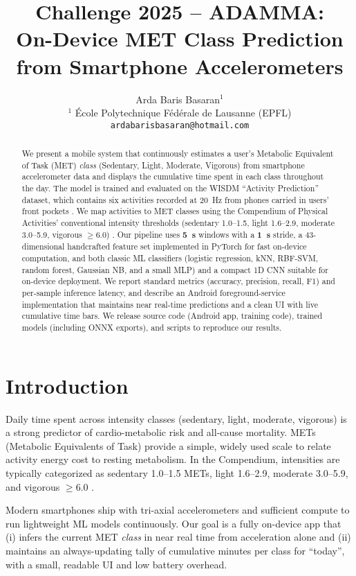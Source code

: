 \documentclass[10pt,twocolumn]{article}
\title{Challenge 2025 -- ADAMMA:\\
On-Device MET Class Prediction from Smartphone Accelerometers}
\author{Arda Baris Basaran$^{1}$ \\
\small $^{1}$ École Polytechnique Fédérale de Lausanne (EPFL) \\
\small \texttt{ardabarisbasaran@hotmail.com}
}
\date{}
\begin{document}
\maketitle

\begin{abstract}
\noindent
We present a mobile system that continuously estimates a user's Metabolic Equivalent of Task (MET) \emph{class} (Sedentary, Light, Moderate, Vigorous) from smartphone accelerometer data and displays the cumulative time spent in each class throughout the day. The model is trained and evaluated on the WISDM ``Activity Prediction'' dataset, which contains six activities recorded at \SI{20}{Hz} from phones carried in users' front pockets \cite{Kwapisz2010,wisdm_site}. We map activities to MET classes using the Compendium of Physical Activities' conventional intensity thresholds (sedentary 1.0--1.5, light 1.6--2.9, moderate 3.0--5.9, vigorous $\geq$6.0) \cite{Compendium2024,Compendium2011}. Our pipeline uses \textbf{\SI{5}{s}} windows with a \textbf{\SI{1}{s}} stride, a 43-dimensional handcrafted feature set implemented in PyTorch for fast on-device computation, and both classic ML classifiers (logistic regression, kNN, RBF-SVM, random forest, Gaussian NB, and a small MLP) and a compact 1D CNN suitable for on-device deployment. We report standard metrics (accuracy, precision, recall, F1) and per-sample inference latency, and describe an Android foreground-service implementation that maintains near real-time predictions and a clean UI with live cumulative time bars. We release source code (Android app, training code), trained models (including ONNX exports), and scripts to reproduce our results.
\end{abstract}


\section{Introduction}
Daily time spent across intensity classes (sedentary, light, moderate, vigorous) is a strong predictor of cardio-metabolic risk and all-cause mortality. METs (Metabolic Equivalents of Task) provide a simple, widely used scale to relate activity energy cost to resting metabolism. In the Compendium, intensities are typically categorized as sedentary 1.0--1.5 METs, light 1.6--2.9, moderate 3.0--5.9, and vigorous $\geq$6.0 \cite{Compendium2024,Compendium2011}. 

Modern smartphones ship with tri-axial accelerometers and sufficient compute to run lightweight ML models continuously. Our goal is a fully on-device app that (i) infers the current MET \emph{class} in near real time from acceleration alone and (ii) maintains an always-updating tally of cumulative minutes per class for ``today'', with a small, readable UI and low battery overhead.
\end{document}
